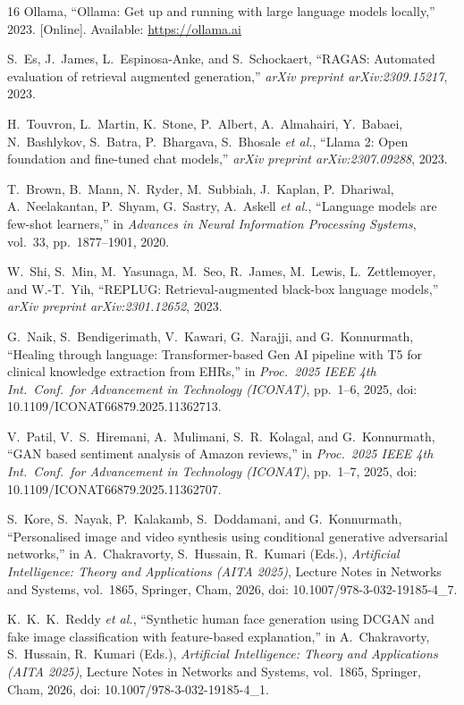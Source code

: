 \documentclass[conference]{IEEEtran}
\begin{document}
\begin{thebibliography}{16}
Ollama,
``Ollama: Get up and running with large language models locally,''
2023. [Online]. Available: \url{https://ollama.ai}

S.~Es, J.~James, L.~Espinosa-Anke, and S.~Schockaert,
``RAGAS: Automated evaluation of retrieval augmented generation,''
\emph{arXiv preprint arXiv:2309.15217}, 2023.

H.~Touvron, L.~Martin, K.~Stone, P.~Albert, A.~Almahairi, Y.~Babaei,
N.~Bashlykov, S.~Batra, P.~Bhargava, S.~Bhosale \emph{et al.},
``Llama 2: Open foundation and fine-tuned chat models,''
\emph{arXiv preprint arXiv:2307.09288}, 2023.

T.~Brown, B.~Mann, N.~Ryder, M.~Subbiah, J.~Kaplan, P.~Dhariwal,
A.~Neelakantan, P.~Shyam, G.~Sastry, A.~Askell \emph{et al.},
``Language models are few-shot learners,''
in \emph{Advances in Neural Information Processing Systems},
vol.~33, pp.~1877--1901, 2020.

W.~Shi, S.~Min, M.~Yasunaga, M.~Seo, R.~James, M.~Lewis,
L.~Zettlemoyer, and W.-T.~Yih,
``REPLUG: Retrieval-augmented black-box language models,''
\emph{arXiv preprint arXiv:2301.12652}, 2023.

G.~Naik, S.~Bendigerimath, V.~Kawari, G.~Narajji, and G.~Konnurmath,
``Healing through language: Transformer-based Gen AI pipeline with T5
for clinical knowledge extraction from EHRs,''
in \emph{Proc.\ 2025 IEEE 4th Int.\ Conf.\ for Advancement in
Technology (ICONAT)}, pp.~1--6, 2025,
doi: 10.1109/ICONAT66879.2025.11362713.

V.~Patil, V.~S.~Hiremani, A.~Mulimani, S.~R.~Kolagal, and
G.~Konnurmath,
``GAN based sentiment analysis of Amazon reviews,''
in \emph{Proc.\ 2025 IEEE 4th Int.\ Conf.\ for Advancement in
Technology (ICONAT)}, pp.~1--7, 2025,
doi: 10.1109/ICONAT66879.2025.11362707.

S.~Kore, S.~Nayak, P.~Kalakamb, S.~Doddamani, and G.~Konnurmath,
``Personalised image and video synthesis using conditional generative
adversarial networks,''
in A.~Chakravorty, S.~Hussain, R.~Kumari (Eds.),
\emph{Artificial Intelligence: Theory and Applications (AITA 2025)},
Lecture Notes in Networks and Systems, vol.~1865,
Springer, Cham, 2026,
doi: 10.1007/978-3-032-19185-4\_7.

K.~K.~K.~Reddy \emph{et al.},
``Synthetic human face generation using DCGAN and fake image
classification with feature-based explanation,''
in A.~Chakravorty, S.~Hussain, R.~Kumari (Eds.),
\emph{Artificial Intelligence: Theory and Applications (AITA 2025)},
Lecture Notes in Networks and Systems, vol.~1865,
Springer, Cham, 2026,
doi: 10.1007/978-3-032-19185-4\_1.

\end{thebibliography}
\end{document}
